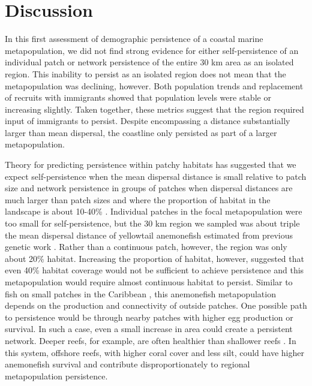 \documentclass[12pt, oneside]{article}   	%
\begin{document}
\section*{Discussion}

In this first assessment of demographic persistence of a coastal marine metapopulation, we did not find strong evidence for either self-persistence of an individual patch or network persistence of the entire 30 km area as an isolated region. This inability to persist as an isolated region does not mean that the metapopulation was declining, however. Both population trends and replacement of recruits with immigrants showed that population levels were stable or increasing slightly. Taken together, these metrics suggest that the region required input of immigrants to persist. Despite encompassing a distance substantially larger than mean dispersal, the coastline only persisted as part of a larger metapopulation.

Theory for predicting persistence within patchy habitats has suggested that we expect self-persistence when the mean dispersal distance is small relative to patch size and network persistence in groups of patches when dispersal distances are much larger than patch sizes and where the proportion of habitat in the landscape is about 10-40\% \citep[depending on the particular species, population, and maximum reproductive rate,][]{botsford2019population}. Individual patches in the focal metapopulation were too small for self-persistence, but the 30 km region we sampled was about triple the mean dispersal distance of yellowtail anemonefish estimated from previous genetic work \citep[8-9 km,][]{pinsky2010using, catalanoInPrepconnectivity}. Rather than a continuous patch, however, the region was only about 20\% habitat. Increasing the proportion of habitat, however, suggested that even 40\% habitat coverage would not be sufficient to achieve persistence and this metapopulation would require almost continuous habitat to persist. Similar to fish on small patches in the Caribbean \citep{johnson2018integrating}, this anemonefish metapopulation depends on the production and connectivity of outside patches. One possible path to persistence would be through nearby patches with higher egg production or survival. In such a case, even a small increase in area could create a persistent network. Deeper reefs, for example, are often healthier than shallower reefs \citep{cinner2016bright}. In this system, offshore reefs, with higher coral cover and less silt, could have higher anemonefish survival and contribute disproportionately to regional metapopulation persistence. 
\end{document}
